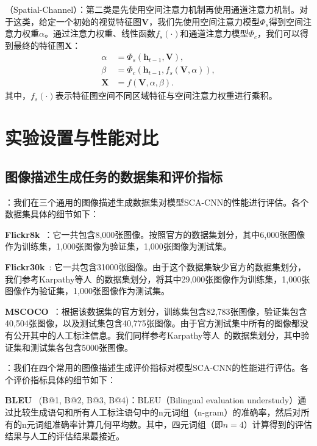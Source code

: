 \textbf{}（Spatial-Channel）：第二类是先使用空间注意力机制再使用通道注意力机制。对于这类，给定一个初始的视觉特征图$\bm{V}$，我们先使用空间注意力模型$\Phi_s$得到空间注意力权重$\alpha$。通过注意力权重、线性函数$f_s(\cdot)$和通道注意力模型$\Phi_c$，我们可以得到最终的特征图$\bm{X}$：
\begin{equation} \label{ch5:eq:eq_9}
\begin{split}
\alpha &= \Phi_s \left(\bm{h}_{t-1}, \bm{V} \right), \\
\beta &= \Phi_c \left(\bm{h}_{t-1}, f_s \left(\bm{V}, \alpha \right) \right), \\
\bm{X} &= f \left(\bm{V}, \alpha, \beta \right).
\end{split}
\end{equation}
其中，$f_s(\cdot)$表示特征图空间不同区域特征与空间注意力权重进行乘积。


\section{实验设置与性能对比}
\subsection{图像描述生成任务的数据集和评价指标}

\textbf{}：我们在三个通用的图像描述生成数据集对模型SCA-CNN的性能进行评估。各个数据集具体的细节如下：

\textbf{Flickr8k}~\cite{hodosh2013framing}：它一共包含8,000张图像。按照官方的数据集划分，其中6,000张图像作为训练集，1,000张图像为验证集，1,000张图像为测试集。

\textbf{Flickr30k}~\cite{young2014image}: 它一共包含31000张图像。由于这个数据集缺少官方的数据集划分，我们参考Karpathy等人~\cite{karpathy2015deep}的数据集划分，将其中29,000张图像作为训练集，1,000张图像作为验证集，1,000张图像作为测试集。

\textbf{MSCOCO}~\cite{lin2014microsoft}：根据该数据集的官方划分，训练集包含82,783张图像，验证集包含40,504张图像，以及测试集包含40,775张图像。由于官方测试集中所有的图像都没有公开其中的人工标注信息。我们同样参考Karpathy等人~\cite{karpathy2015deep}的数据集划分，其中验证集和测试集各包含5000张图像。

\textbf{}：我们在四个常用的图像描述生成评价指标对模型SCA-CNN的性能进行评估。各个评价指标具体的细节如下：

\textbf{BLEU}~\cite{papineni2002bleu} (B@1, B@2, B@3, B@4)：BLEU（Bilingual evaluation understudy）通过比较生成语句和所有人工标注语句中的n元词组（n-gram）的准确率，然后对所有的n元词组准确率计算几何平均数。其中，四元词组（即$n=4$）计算得到的评估结果与人工的评估结果最接近。

